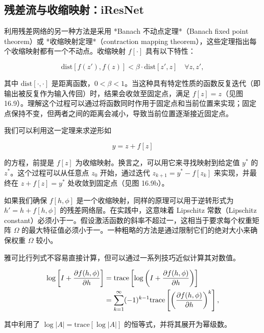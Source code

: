 \documentclass[lang=cn,newtx,10pt,scheme=chinese]{elegantbook}
\begin{document}
\subsection{残差流与收缩映射：iResNet}
利用残差网络的另一种方法是采用 *Banach 不动点定理*（Banach fixed point theorem）或 *收缩映射定理*（contraction mapping theorem），这些定理指出每个收缩映射都有一个不动点。收缩映射 \(f[\cdot]\) 具有以下特性：

\begin{equation}
\text{dist} [f(z'), f(z)] < \beta \cdot \text{dist} [z', z] \quad \forall z, z', 
\end{equation}

其中 \(\text{dist}[\cdot,\cdot]\) 是距离函数，\(0 < \beta < 1\)。当这种具有特定性质的函数反复迭代（即输出被反复作为输入传回）时，结果会收敛至固定点，满足 \(f[z] = z\)（见图 16.9）。理解这个过程可以通过将函数同时作用于固定点和当前位置来实现；固定点保持不变，但两者之间的距离会减小，导致当前位置逐渐接近固定点。

我们可以利用这一定理来求逆形如

\begin{equation}
y = z + f[z] 
\end{equation}

的方程，前提是 \(f[z]\) 为收缩映射。换言之，可以用它来寻找映射到给定值 \(y^*\) 的 \(z^*\)。这个过程可以从任意点 \(z_0\) 开始，通过迭代 \(z_{k+1} = y^* - f[z_k]\) 来实现，并最终在 \(z + f[z] = y^*\) 处收敛到固定点（见图 16.9b）。

如果我们确保 \(f[h, \phi]\) 是一个收缩映射，同样的原理可以用于逆转形式为 \(h' = h + f[h, \phi]\) 的残差网络层。在实践中，这意味着 Lipschitz 常数（Lipschitz constant）必须小于一。假设激活函数的斜率不超过一，这相当于要求每个权重矩阵 \(\Omega\) 的最大特征值必须小于一。一种粗略的方法是通过限制它们的绝对大小来确保权重 \(\Omega\) 较小。

雅可比行列式不容易直接计算，但可以通过一系列技巧近似计算其对数值。

\begin{align}
\log \left[ I + \frac{\partial f(h, \phi)}{\partial h} \right] &= \text{trace} \left[ \log \left( I + \frac{\partial f(h, \phi)}{\partial h} \right) \right] \notag \\
&= \sum_{k=1}^{\infty} (-1)^{k-1} \text{trace} \left[ \left( \frac{\partial f(h, \phi)}{\partial h} \right)^k \right], 
\end{align} 



其中利用了 \(\log|A| = \text{trace}[\log|A|]\) 的恒等式，并将其展开为幂级数。
\end{document}

